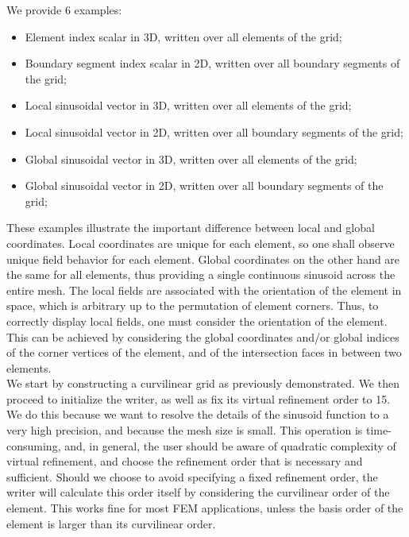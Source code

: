 \noindent
We provide 6 examples:
\begin{itemize}
  \item Element index scalar in 3D, written over all elements of the grid;
  \item Boundary segment index scalar in 2D, written over all boundary segments of the grid;
  \item Local sinusoidal vector in 3D, written over all elements of the grid;
  \item Local sinusoidal vector in 2D, written over all boundary segments of the grid;
  \item Global sinusoidal vector in 3D, written over all elements of the grid;
  \item Global sinusoidal vector in 2D, written over all boundary segments of the grid;
\end{itemize}

\noindent
These examples illustrate the important difference between local and global coordinates. Local coordinates are unique for each element, so one shall observe unique field behavior for each element. Global coordinates on the other hand are the same for all elements, thus providing a single continuous sinusoid across the entire mesh. The local fields are associated with the orientation of the element in space, which is arbitrary up to the permutation of element corners. Thus, to correctly display local fields, one must consider the orientation of the element. This can be achieved by considering the global coordinates and/or global indices of the corner vertices of the element, and of the intersection faces in between two elements. \\

\noindent
We start by constructing a curvilinear grid as previously demonstrated. We then proceed to initialize the writer, as well as fix its virtual refinement order to 15. We do this because we want to resolve the details of the sinusoid function to a very high precision, and because the mesh size is small. This operation is time-consuming, and, in general, the user should be aware of quadratic complexity of virtual refinement, and choose the refinement order that is necessary and sufficient. Should we choose to avoid specifying a fixed refinement order, the writer will calculate this order itself by considering the curvilinear order of the element. This works fine for most FEM applications, unless the basis order of the element is larger than its curvilinear order. \\

